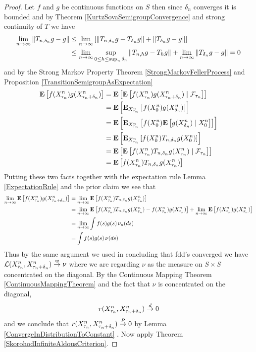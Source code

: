 \begin{proof}
Let $f$ and $g$ be continuous functions on $S$ then since $\delta_n$ converges it is bounded and by Theorem \ref{KurtzSovaSemigroupConvergence} and strong continuity of $T$ we have
\begin{align*}
\lim_{n \to \infty} \norm{T_{n, \delta_n} g - g} &\leq \lim_{n \to \infty} \left[ \norm{T_{n, \delta_n} g - T_{\delta_n} g} + \norm{T_{\delta_n} g - g} \right ] \\ 
&\leq \lim_{n \to \infty} \sup_{0 \leq h \leq \sup_n \delta_n} \norm{T_{n,h} g - T_{h} g} + \lim_{n \to \infty}\norm{T_{\delta_n} g - g} = 0
\end{align*}
and by the Strong Markov Property Theorem \ref{StrongMarkovFellerProcess} and Proposition \ref{TransitionSemigroupAsExpectation}
\begin{align*}
\expectation{f(X^n_{\tau_n}) g(X^n_{\tau_n+\delta_n})} &= \expectation{\cexpectationlong{\mathcal{F}_{\tau_n}}{f(X^n_{\tau_n}) g(X^n_{\tau_n+\delta_n})}} \\
&= \expectation{\sexpectation{f(X^n_{0}) g(X^n_{\delta_n})}{X^n_{\tau_n}}} \\
&= \expectation{\sexpectation{f(X^n_{0}) \cexpectationlong{X^n_0}{g(X^n_{\delta_n})}}{X^n_{\tau_n}}} \\
&= \expectation{\sexpectation{f(X^n_{0}) T_{n,\delta_n}g(X^n_{0})}{X^n_{\tau_n}}} \\
&= \expectation{\cexpectationlong{\mathcal{F}_{\tau_n}}{f(X^n_{\tau_n}) T_{n,\delta_n}g(X^n_{\tau_n})}} \\
&= \expectation{f(X^n_{\tau_n}) T_{n,\delta_n}g(X^n_{\tau_n})} \\
\end{align*}
Putting these two facts together with the expectation rule Lemma \ref{ExpectationRule} and the prior claim we see that
\begin{align*}
\lim_{n \to \infty} \expectation{f(X^n_{\tau_n}) g(X^n_{\tau_n+\delta_n})} &= \lim_{n \to \infty} \expectation{f(X^n_{\tau_n}) T_{n,\delta_n}g(X^n_{\tau_n})}\\
&= \lim_{n \to \infty} \expectation{f(X^n_{\tau_n}) T_{n,\delta_n}g(X^n_{\tau_n}) - f(X^n_{\tau_n}) g(X^n_{\tau_n})} + \lim_{n \to \infty} \expectation{f(X^n_{\tau_n}) g(X^n_{\tau_n}) } \\
&= \lim_{n \to \infty} \int f(s) g(s) \, \nu_n(ds) \\
&= \int f(s) g(s) \, \nu(ds) \\
\end{align*}
Thus by the same argument we used in concluding that fdd's converged we have $\mathcal{L}(X^n_{\tau_n}, X^n_{\tau_n+\delta_n}) \toweak \nu$ where we are regarding $\nu$ as the measure on $S \times S$ concentrated on the diagonal.
By the Continuous Mapping Theorem \ref{ContinuousMappingTheorem} and the fact that $\nu$ is concentrated on the diagonal,
\begin{align*}
r(X^n_{\tau_n}, X^n_{\tau_n+\delta_n}) \todist 0
\end{align*}
and we conclude that $r(X^n_{\tau_n}, X^n_{\tau_n+\delta_n}) \toprob 0$ by Lemma \ref{ConvergeInDistributionToConstant} . Now apply Theorem \ref{SkorohodInfiniteAldousCriterion}.
\end{proof}

